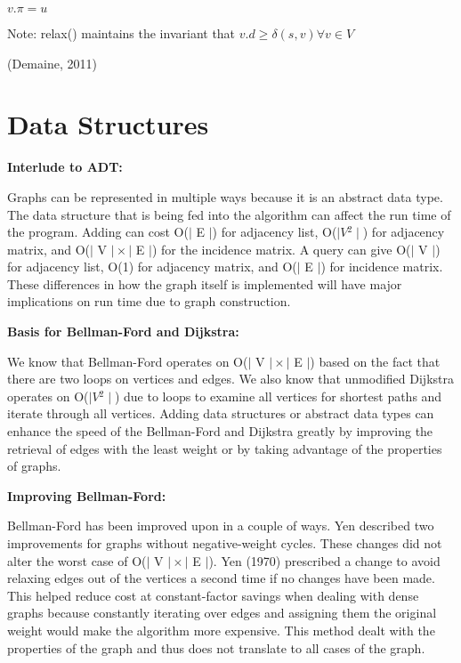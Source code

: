 \documentclass{article}
\begin{document}
\hspace{5 pt}\hspace{5 pt}\hspace{5 pt}\hspace{5 pt}\hspace{5 pt}\hspace{5 pt}$v.\pi = u$

Note: relax() maintains the invariant that $v.d \geq \delta(s,v) \forall v \in V$

(Demaine, 2011)

\section{Data Structures}

\textbf{Interlude to ADT:}

Graphs can be represented in multiple ways because it is an abstract data type.  The data structure that is being fed into the algorithm can affect the run time of the program.  Adding can cost O($\mid$ E $\mid$) for adjacency list, O($\mid V{^2} \mid$) for adjacency matrix, and O($\mid$ V $\mid \times \mid$ E $\mid$) for the incidence matrix.  A query can give O($\mid$ V $\mid$) for adjacency list, O(1) for adjacency matrix, and O($\mid$ E $\mid$) for incidence matrix. These differences in how the graph itself is implemented will have major implications on run time due to graph construction.

\textbf{Basis for Bellman-Ford and Dijkstra:}

We know that Bellman-Ford operates on O($\mid$ V $\mid \times \mid$ E $\mid$) based  on the fact that there are two loops on vertices and edges.  We also know that unmodified Dijkstra operates on O($\mid V{^2} \mid$) due to loops to examine all vertices for shortest paths and iterate through all vertices.  Adding data structures or abstract data types can enhance the speed of the Bellman-Ford and Dijkstra greatly by improving the retrieval of edges with the least weight or by taking advantage of the properties of graphs.

\textbf{Improving Bellman-Ford:}

Bellman-Ford has been improved upon in a couple of ways.  Yen described two improvements for graphs without negative-weight cycles.  These changes did not alter the worst case of O($\mid$ V $\mid \times \mid$ E $\mid$).  
Yen (1970) prescribed a change to avoid relaxing edges out of the vertices a second time if no changes have been made. This helped reduce cost at constant-factor savings when dealing with dense graphs because constantly iterating over edges and assigning them the original weight would make the algorithm more expensive.  This method dealt with the properties of the graph and thus does not translate to all cases of the graph.
\end{document}
